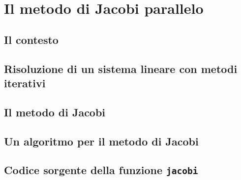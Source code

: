 \documentclass[
	a4paper,
	twoside,
	12pt
]{book}
\begin{document}
\chapter{Il metodo di Jacobi parallelo}
\label{cap3}

\section{Il contesto}

\section{Risoluzione di un sistema lineare con metodi iterativi}

\section{Il metodo di Jacobi}

\section{Un algoritmo per il metodo di Jacobi}

\begin{appendix}
\chapter[Codice sorgente della funzione jacobi]{Codice sorgente della funzione \lstinline{jacobi}}

\label{app:jacobi}
\end{appendix}
\backmatter
\printbibliography
{}
\end{document}
